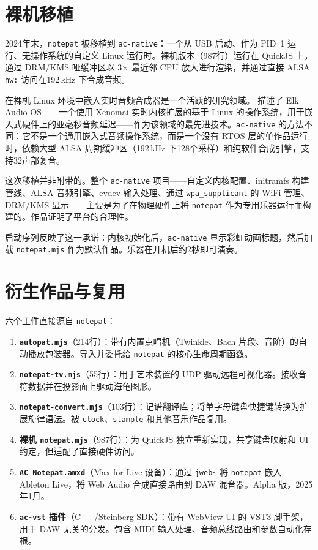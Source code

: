 \documentclass[10pt,letterpaper,twocolumn]{article}
\begin{document}
\section{裸机移植}

2024年末，\texttt{notepat} 被移植到 \texttt{ac-native}：一个从 USB 启动、作为 PID~1 运行、无操作系统的自定义 Linux 运行时。裸机版本（987行）运行在 QuickJS 上，通过 DRM/KMS 哑缓冲区以 3$\times$ 最近邻 CPU 放大进行渲染，并通过直接 ALSA \texttt{hw:} 访问在192\,kHz 下合成音频。

在裸机 Linux 环境中嵌入实时音频合成器是一个活跃的研究领域。\citet{turchet2021elk} 描述了 Elk Audio OS——一个使用 Xenomai 实时内核扩展的基于 Linux 的操作系统，用于嵌入式硬件上的亚毫秒音频延迟——作为该领域的最先进技术。\texttt{ac-native} 的方法不同：它不是一个通用嵌入式音频操作系统，而是一个没有 RTOS 层的单作品运行时，依赖大型 ALSA 周期缓冲区（192\,kHz 下128个采样）和纯软件合成引擎，支持32声部复音。

这次移植并非附带的。整个 \texttt{ac-native} 项目——自定义内核配置、initramfs 构建管线、ALSA 音频引擎、evdev 输入处理、通过 \texttt{wpa\_supplicant} 的 WiFi 管理、DRM/KMS 显示——主要是为了在物理硬件上将 \texttt{notepat} 作为专用乐器运行而构建的。作品证明了平台的合理性。

启动序列反映了这一承诺：内核初始化后，\texttt{ac-native} 显示彩虹动画标题，然后加载 \texttt{notepat.mjs} 作为默认作品。乐器在开机后约2秒即可演奏。

\section{衍生作品与复用}

六个工件直接源自 \texttt{notepat}：

\begin{enumerate}
  \item \textbf{\texttt{autopat.mjs}}（214行）：带有内置点唱机（Twinkle、Bach 片段、音阶）的自动播放包装器。导入并委托给 \texttt{notepat} 的核心生命周期函数。
  \item \textbf{\texttt{notepat-tv.mjs}}（55行）：用于艺术装置的 UDP 驱动远程可视化器。接收音符数据并在投影面上驱动海龟图形。
  \item \textbf{\texttt{notepat-convert.mjs}}（103行）：记谱翻译库；将单字母键盘快捷键转换为扩展旋律语法。被 \texttt{clock}、\texttt{stample} 和其他音乐作品复用。
  \item \textbf{裸机 \texttt{notepat.mjs}}（987行）：为 QuickJS 独立重新实现，共享键盘映射和 UI 约定，但适配了直接硬件访问。
  \item \textbf{\texttt{AC Notepat.amxd}}（Max for Live 设备）：通过 \texttt{jweb\textasciitilde} 将 \texttt{notepat} 嵌入 Ableton Live，将 Web Audio 合成直接路由到 DAW 混音器。Alpha 版，2025年1月。
  \item \textbf{\texttt{ac-vst} 插件}（C++/Steinberg SDK）：带有 WebView UI 的 VST3 脚手架，用于 DAW 无关的分发。包含 MIDI 输入处理、音频总线路由和参数自动化存根。
\end{enumerate}
\end{document}
